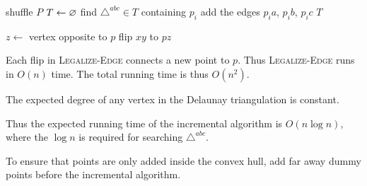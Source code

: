 \begin{algo}
        \State shuffle $P$
        \State $T \gets \varnothing$
            \State find $\triangle^{abc} \in T$ containing $p_i$
            \State add the edges $p_ia$, $p_ib$, $p_ic$
                \State {}
            \EndFor
        \EndFor
        \State \Return $T$
    \EndFn
\end{algo}
\begin{algo}
        \State $z \gets$ vertex opposite to $p$
            \State flip $xy$ to $pz$
            \State {}
            \State {}
        \EndIf
    \EndFn
\end{algo}
Each flip in \textsc{Legalize-Edge} connects a new point to $p$.
Thus \textsc{Legalize-Edge} runs in $O(n)$ time.
The total running time is thus $O(n^2)$.

\begin{fact}
    The expected degree of any vertex in the Delaunay triangulation is
    constant.
\end{fact}
Thus the expected running time of the incremental algorithm is $O(n \log n)$,
where the $\log n$ is required for searching $\triangle^{abc}$.

To ensure that points are only added inside the convex hull, add far away
dummy points before the incremental algorithm.
